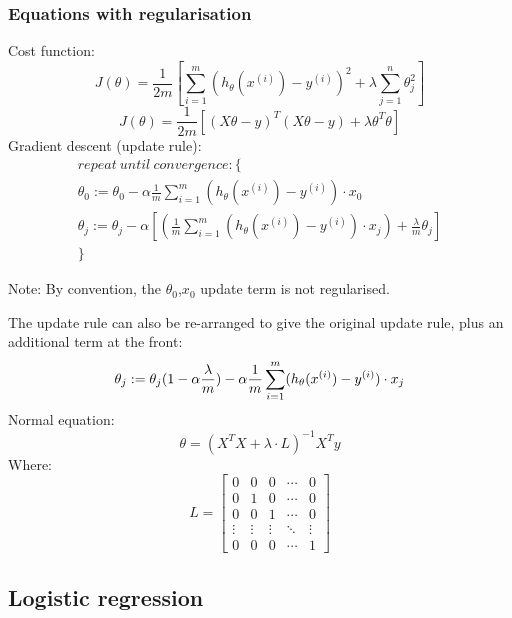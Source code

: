 \documentclass[12pt]{article}
\begin{document}
\subsubsection{Equations with regularisation}
Cost function:
\begin{equation}
J(\theta)=\frac{1}{2m}[\sum_{i=1}^{m}(h_{\theta}(x^{(i)})-y^{(i)})^{2}+\lambda\sum_{j=1}^{n}\theta_j^{2}]
\end{equation}
\begin{equation}
J(\theta)=\frac{1}{2m}[(X\theta-y)^{T}(X\theta-y)+\lambda\theta^{T}\theta]
\end{equation}
Gradient descent (update rule):
\begin{multline}
repeat\:until\:convergence: \{\\
\theta_0:=\theta_{0}-\alpha\frac{1}{m}\sum_{i=1}^{m}(h_{\theta}(x^{(i)})-y^{(i)})\cdot x_0\\
\theta_j:=\theta_{j}-\alpha [(\frac{1}{m}\sum_{i=1}^{m}(h_{\theta}(x^{(i)})-y^{(i)})\cdot x_j)+\frac{\lambda}{m}\theta_j]\\
\}
\end{multline}
\begin{flushleft}
Note: By convention, the $\theta_0$,$x_0$ update term is not regularised.
\end{flushleft}
The update rule can also be re-arranged to give the original update rule, plus an additional term at the front:
\begin{equation}
\theta_j:=\theta_{j}(1-\alpha\frac{\lambda}{m})-\alpha\frac{1}{m}\sum_{i=1}^{m}(h_{\theta}(x^{(i)})-y^{(i)})\cdot x_j\\
\end{equation}
Normal equation:
\begin{equation}
\theta=(X^{T}X+\lambda \cdot L)^{-1}X^{T}y
\end{equation}
Where:
\begin{equation}
L=\begin{bmatrix}0 & 0 & 0 & \cdots & 0\\
0 & 1 & 0 & \cdots & 0\\
0 & 0 & 1 & \cdots & 0\\
\vdots & \vdots & \vdots & \ddots & \vdots\\
0 & 0 & 0 & \cdots & 1
\end{bmatrix}
\end{equation}
\newpage

\subsection{Logistic regression}
\end{document}
